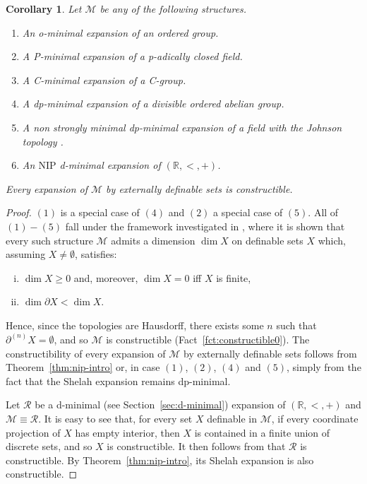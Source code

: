 \documentclass[12pt]{article}
\newcommand{\Mm}{\mathcal{M}}
\newcommand{\Rr}{\mathcal{R}}
\newcommand{\R}{\mathbb{R}}
\newcommand{\NIP}{\ensuremath{\mathrm{NIP}}}
\newcommand{\partn}[1]{\partial^{(#1)}}
\newtheorem{corollary}[theorem]{Corollary}
\theoremstyle{definition}
\theoremstyle{remark}
\begin{document}
\begin{corollary}\label{cor:shelah-exp}
Let $\Mm$ be any of the following structures. 
\begin{enumerate}
    \item An o-minimal expansion of an ordered group.  
    \item A P-minimal expansion of a p-adically closed field. 
    \item A C-minimal expansion of a C-group. 
    \item A dp-minimal expansion of a divisible ordered abelian group.
    \item A non strongly minimal dp-minimal expansion of a field with the Johnson topology \cite{johnson-topology}.
    \item An $\NIP$ d-minimal expansion of $(\R,<,+)$.
\end{enumerate}
Every expansion of $\Mm$ by externally definable sets is constructible. 
\end{corollary}
\begin{proof}
$(1)$ is a special case of $(4)$ and $(2)$ a special case of $(5)$. All of $(1)-(5)$ fall under the framework investigated in \cite{sim-wals19}, where it is shown that every such structure $\Mm$ admits a dimension $\dim X$ on definable sets $X$ which, assuming $X\neq \emptyset$, satisfies:  
\begin{enumerate}[(i)]
    \item $\dim X \geq 0$ and, moreover, $\dim X=0$ iff $X$ is finite,
    \item $\dim \partial X < \dim X$. 
\end{enumerate}
Hence, since the topologies are Hausdorff, there exists some $n$ such that $\partn{n}X = \emptyset$, and so $\Mm$ is constructible (Fact~\ref{fct:constructible0}). The constructibility of every expansion of $\Mm$ by externally definable sets follows from Theorem~\ref{thm:nip-intro} or, in case $(1)$, $(2)$, $(4)$ and $(5)$, simply from the fact that the Shelah expansion remains dp-minimal. 

Let $\Rr$ be a d-minimal (see Section~\ref{sec:d-minimal}) expansion of $(\R,<,+)$ and $\Mm\equiv \Rr$. It is easy to see that, for every set $X$ definable in $\Mm$, if every coordinate projection of $X$ has empty interior, then $X$ is contained in a finite union of discrete sets, and so $X$ is constructible. It then follows from \cite[Theorem 3.2]{miller05-tame} that $\Rr$ is constructible. By Theorem~\ref{thm:nip-intro}, its Shelah expansion is also constructible. 
\end{proof}
\end{document}
